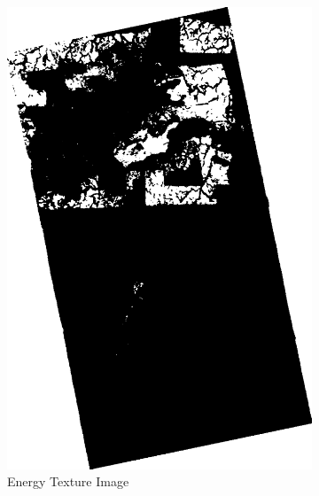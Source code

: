   \begin{figure}[H]\ContinuedFloat
    \centering
    \begin{subfigure}[b]{0.4\linewidth}
      \includegraphics[width=\linewidth]{Cap3-Results/sum_and_diff_textures/energyimage.png}
       \caption{Energy Texture Image}
    \end{subfigure}
    \centering
    \begin{subfigure}[b]{0.4\linewidth}

\end{subfigure}
\end{figure}

